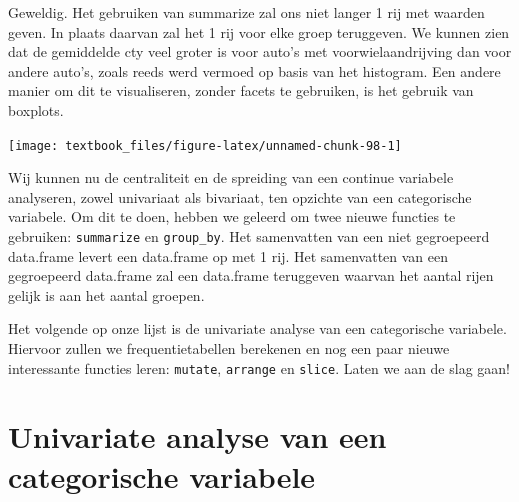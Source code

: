 \documentclass[]{tufte-book}
\newenvironment{Shaded}{}{}
\newcommand{\DataTypeTok}[1]{\textcolor[rgb]{0.56,0.13,0.00}{#1}}
\newcommand{\DecValTok}[1]{\textcolor[rgb]{0.25,0.63,0.44}{#1}}
\newcommand{\FloatTok}[1]{\textcolor[rgb]{0.25,0.63,0.44}{#1}}
\newcommand{\KeywordTok}[1]{\textcolor[rgb]{0.00,0.44,0.13}{\textbf{#1}}}
\newcommand{\NormalTok}[1]{#1}
\newcommand{\OperatorTok}[1]{\textcolor[rgb]{0.40,0.40,0.40}{#1}}
\newcommand{\StringTok}[1]{\textcolor[rgb]{0.25,0.44,0.63}{#1}}
\begin{document}
Geweldig. Het gebruiken van summarize zal ons niet langer 1 rij met waarden geven. In plaats daarvan zal het 1 rij voor elke groep teruggeven. We kunnen zien dat de gemiddelde cty veel groter is voor auto's met voorwielaandrijving dan voor andere auto's, zoals reeds werd vermoed op basis van het histogram. Een andere manier om dit te visualiseren, zonder facets te gebruiken, is het gebruik van boxplots.

\begin{Shaded}
\end{Shaded}

\texttt{[image: textbook\_files/figure-latex/unnamed-chunk-98-1]}

Wij kunnen nu de centraliteit en de spreiding van een continue variabele analyseren, zowel univariaat als bivariaat, ten opzichte van een categorische variabele. Om dit te doen, hebben we geleerd om twee nieuwe functies te gebruiken: \texttt{summarize} en \texttt{group\_by}. Het samenvatten van een niet gegroepeerd data.frame levert een data.frame op met 1 rij. Het samenvatten van een gegroepeerd data.frame zal een data.frame teruggeven waarvan het aantal rijen gelijk is aan het aantal groepen.

Het volgende op onze lijst is de univariate analyse van een categorische variabele. Hiervoor zullen we frequentietabellen berekenen en nog een paar nieuwe interessante functies leren: \texttt{mutate}, \texttt{arrange} en \texttt{slice}. Laten we aan de slag gaan!

\newpage

\hypertarget{univariate-analyse-van-een-categorische-variabele}{%
\section{Univariate analyse van een categorische variabele}\label{univariate-analyse-van-een-categorische-variabele}}
\end{document}
